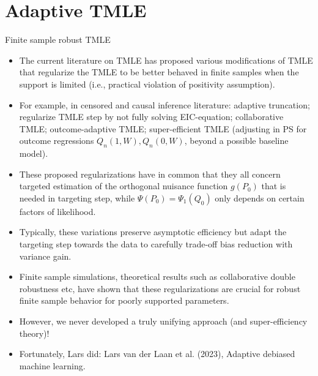 \documentclass[t]{beamer}
\newlength{\wideitemsep}
\let\olditem\item
\renewcommand{\item}{\setlength{\itemsep}{\wideitemsep}\olditem}
\begin{document}
\section{Adaptive TMLE}
\begin{frame}{Finite sample robust TMLE}
\begin{itemize}
\item The current literature on TMLE has proposed various modifications of TMLE that regularize the TMLE to be better behaved in finite samples when the support is limited (i.e., practical violation of positivity assumption).
\item For example, in censored and causal inference literature: adaptive truncation; regularize TMLE step by not fully solving EIC-equation; collaborative TMLE; outcome-adaptive TMLE; super-efficient TMLE (adjusting in PS for outcome regressions $Q_n(1,W),Q_n(0,W)$, beyond a possible baseline model).
\item These proposed regularizations have in common that they all concern targeted estimation of the orthogonal nuisance function $g(P_0)$ that is needed in targeting step, while $\Psi(P_0)=\Psi_1(Q_0)$ only depends on certain factors of likelihood.
\end{itemize}
\end{frame}
\begin{frame}
\begin{itemize}
\item Typically, these variations preserve asymptotic efficiency but adapt the targeting step towards the data to carefully trade-off bias reduction with variance gain.
\item Finite sample simulations, theoretical results such as collaborative double robustness etc, have shown that these regularizations are crucial for robust finite sample behavior for poorly supported parameters.
\item However, we never developed a truly unifying approach (and super-efficiency theory)!
\item Fortunately, Lars did: Lars van der Laan et al. (2023), Adaptive debiased machine learning.
\end{itemize}
\end{frame}
\end{document}
